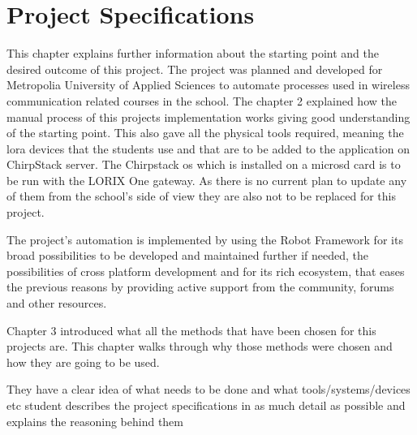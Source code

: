 
\chapter{Project Specifications} \label{ch:project_spec}
This chapter explains further information about the starting point and the desired outcome of this project.
The project was planned and developed for Metropolia University of Applied Sciences to automate processes used in wireless communication related courses in the school.
The chapter 2 explained how the manual process of this projects implementation works giving good understanding of the starting point.
This also gave all the physical tools required, meaning the \gls{lora} devices that the students use and that are to be added to the application on ChirpStack server.
The Chirpstack \gls{os} which is installed on a micro\gls{sd} card is to be run with the LORIX One gateway.
As there is no current plan to update any of them from the school's side of view they are also not to be replaced for this project.

The project's automation is implemented by using the Robot Framework for its broad possibilities to be developed and maintained further if needed, the possibilities of cross platform development and for its rich ecosystem, that eases the previous reasons by providing active support from the community, forums and other resources.

Chapter 3 introduced what all the methods that have been chosen for this projects are.
This chapter walks through why those methods were chosen and how they are going to be used.


They have 
a clear idea of what needs to be done and what tools/systems/devices etc
student describes the project specifications in as much detail as 
possible and explains the reasoning behind them
\clearpage %
